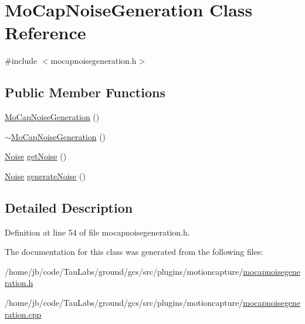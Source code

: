 \hypertarget{class_mo_cap_noise_generation}{\section{\-Mo\-Cap\-Noise\-Generation \-Class \-Reference}
\label{class_mo_cap_noise_generation}
}


{\ttfamily \#include $<$mocapnoisegeneration.\-h$>$}

\subsection*{\-Public \-Member \-Functions}
\begin{DoxyCompactItemize}
\item 
\hyperlink{group___mo_cap_plugin_ga8157e4474b5a83adb73bbf40aa9f5fe6}{\-Mo\-Cap\-Noise\-Generation} ()
\item 
\hyperlink{group___mo_cap_plugin_ga8881b0089bfba1918a16456398fabb55}{$\sim$\-Mo\-Cap\-Noise\-Generation} ()
\item 
\hyperlink{struct_noise}{\-Noise} \hyperlink{group___mo_cap_plugin_ga0fe5a906dcd6c5d3dd92267217fdb9ef}{get\-Noise} ()
\item 
\hyperlink{struct_noise}{\-Noise} \hyperlink{group___mo_cap_plugin_gab39e02794679a919f0d20b1901ec28c4}{generate\-Noise} ()
\end{DoxyCompactItemize}


\subsection{\-Detailed \-Description}


\-Definition at line 54 of file mocapnoisegeneration.\-h.



\-The documentation for this class was generated from the following files\-:\begin{DoxyCompactItemize}
\item 
/home/jb/code/\-Tau\-Labs/ground/gcs/src/plugins/motioncapture/\hyperlink{mocapnoisegeneration_8h}{mocapnoisegeneration.\-h}\item 
/home/jb/code/\-Tau\-Labs/ground/gcs/src/plugins/motioncapture/\hyperlink{mocapnoisegeneration_8cpp}{mocapnoisegeneration.\-cpp}\end{DoxyCompactItemize}
